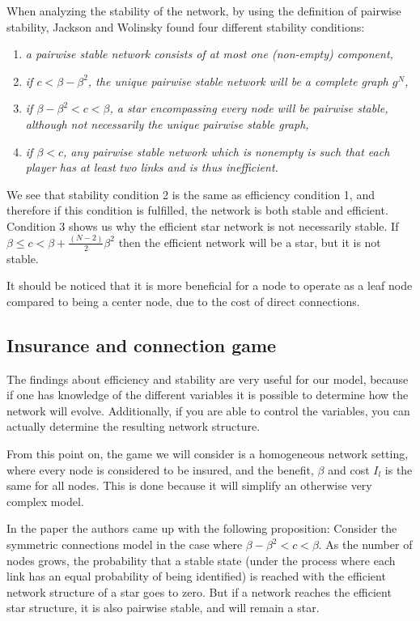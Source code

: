 When analyzing the stability of the network, by using the definition of pairwise stability, Jackson and Wolinsky found four different stability conditions:

\begin{enumerate}
\item \textit{a pairwise stable network consists of at most one (non-empty) component,}
\item \textit{if $c<\beta - \beta^2$, the unique pairwise stable network will be a complete graph $g^N$, }
\item \textit{if $\beta - \beta^2 <c < \beta $, a star encompassing every node will be pairwise stable, although not necessarily the unique pairwise stable graph,}
\item \textit{if $\beta < c$, any pairwise stable network which is nonempty is such that each player has at least two links and is thus inefficient. }
\end{enumerate}
We see that stability condition 2 is the same as efficiency condition 1, and therefore if this condition is fulfilled, the network is both stable and efficient. 
Condition 3 shows us why the efficient star network is not necessarily stable. If $\beta \leq c <   \beta + \frac{(N-2)}{2}\beta^2$ then the efficient network will be a star, but it is not stable.

It should be noticed that it is more beneficial for a node to operate as a leaf node compared to being a center node, due to the cost of direct connections.  

\subsection{Insurance and connection game}
The findings about efficiency and stability are very useful for our model, because if one has knowledge of the different variables it is possible to determine how the network will evolve. Additionally, if you are able to control the variables, you can actually determine the resulting network structure.

From this point on, the game we will consider is a homogeneous network setting, where every node is considered to be insured, and the benefit, $\beta$ and cost $I_{l}$ is the same for all nodes.
This is done because it will simplify an otherwise very complex model. 

In the paper \cite{jackson2005survey} the authors came up with the following proposition:
Consider the symmetric connections model in the case where $\beta-\beta^2<c<\beta$. As the number of nodes grows, the probability that a stable state (under the process where each link has an equal probability of being identified) is reached with the efficient network structure of a star goes to zero. But if a network reaches the efficient star structure, it is also pairwise stable, and will remain a star. 




